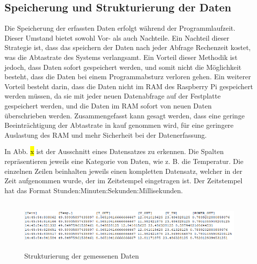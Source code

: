 \subsection{Speicherung und Strukturierung der Daten}
Die Speicherung der erfassten Daten erfolgt während der Programmlaufzeit. Dieser Umstand bietet sowohl Vor- als auch Nachteile. Ein Nachteil dieser Strategie ist, dass das speichern der Daten nach jeder Abfrage Rechenzeit kostet, was die Abtastrate des Systems verlangsamt. Ein Vorteil dieser Methodik ist jedoch, dass Daten sofort gespeichert werden, und somit nicht die Möglichkeit besteht, dass die Daten bei einem Programmabsturz verloren gehen. Ein weiterer Vorteil besteht darin, dass die Daten nicht im RAM des Raspberry Pi gespeichert werden müssen, da sie mit jeder neuen Datenabfrage auf der Festplatte gespeichert werden, und die Daten im RAM sofort von neuen Daten überschrieben werden. Zusammengefasst kann gesagt werden, dass eine geringe Beeinträchtigung der Abtastrate in kauf genommen wird, für eine geringere Auslastung des RAM und mehr Sicherheit bei der Datenerfassung.

In Abb. \hl{x} ist der Ausschnitt eines Datensatzes zu erkennen. Die Spalten repräsentieren jeweils eine Kategorie von Daten, wie z. B. die Temperatur. Die einzelnen Zeilen beinhalten jeweils einen kompletten Datensatz, welcher in der Zeit aufgenommen wurde, der im Zeitstempel eingetragen ist. Der Zeitstempel hat das Format Stunden:Minuten:Sekunden:Millisekunden.

\begin{figure}[H]
    \centering
    \includegraphics[height= 2.5cm, width = \textwidth]{Pictures/dat_struct.png}
    \caption{Strukturierung der gemessenen Daten}
\end{figure}



